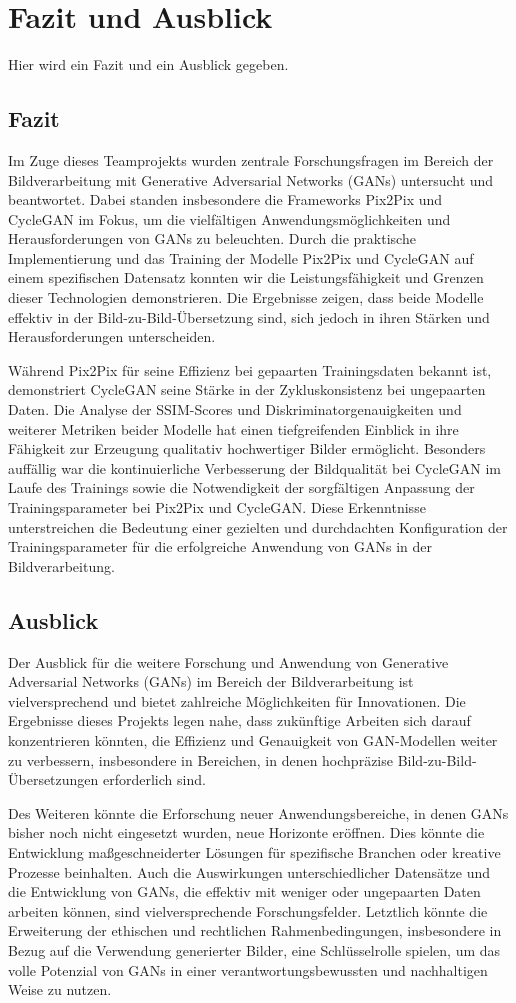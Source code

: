 \chapter{Fazit und Ausblick}
Hier wird ein Fazit und ein Ausblick gegeben.

\section{Fazit}
Im Zuge dieses Teamprojekts wurden zentrale Forschungsfragen im Bereich der Bildverarbeitung mit Generative Adversarial Networks (GANs) untersucht und beantwortet. Dabei standen insbesondere die Frameworks Pix2Pix und CycleGAN im Fokus, um die vielfältigen Anwendungsmöglichkeiten und Herausforderungen von GANs zu beleuchten. Durch die praktische Implementierung und das Training der Modelle Pix2Pix und CycleGAN auf einem spezifischen Datensatz konnten wir die Leistungsfähigkeit und Grenzen dieser Technologien demonstrieren. Die Ergebnisse zeigen, dass beide Modelle effektiv in der Bild-zu-Bild-Übersetzung sind, sich jedoch in ihren Stärken und Herausforderungen unterscheiden.

Während Pix2Pix für seine Effizienz bei gepaarten Trainingsdaten bekannt ist, demonstriert CycleGAN seine Stärke in der Zykluskonsistenz bei ungepaarten Daten. Die Analyse der SSIM-Scores und Diskriminatorgenauigkeiten und weiterer Metriken beider Modelle hat einen tiefgreifenden Einblick in ihre Fähigkeit zur Erzeugung qualitativ hochwertiger Bilder ermöglicht. Besonders auffällig war die kontinuierliche Verbesserung der Bildqualität bei CycleGAN im Laufe des Trainings sowie die Notwendigkeit der sorgfältigen Anpassung der Trainingsparameter bei Pix2Pix und CycleGAN. Diese Erkenntnisse unterstreichen die Bedeutung einer gezielten und durchdachten Konfiguration der Trainingsparameter für die erfolgreiche Anwendung von GANs in der Bildverarbeitung.

\section{Ausblick}
Der Ausblick für die weitere Forschung und Anwendung von Generative Adversarial Networks (GANs) im Bereich der Bildverarbeitung ist vielversprechend und bietet zahlreiche Möglichkeiten für Innovationen. Die Ergebnisse dieses Projekts legen nahe, dass zukünftige Arbeiten sich darauf konzentrieren könnten, die Effizienz und Genauigkeit von GAN-Modellen weiter zu verbessern, insbesondere in Bereichen, in denen hochpräzise Bild-zu-Bild-Übersetzungen erforderlich sind.

Des Weiteren könnte die Erforschung neuer Anwendungsbereiche, in denen GANs bisher noch nicht eingesetzt wurden, neue Horizonte eröffnen. Dies könnte die Entwicklung maßgeschneiderter Lösungen für spezifische Branchen oder kreative Prozesse beinhalten. Auch die Auswirkungen unterschiedlicher Datensätze und die Entwicklung von GANs, die effektiv mit weniger oder ungepaarten Daten arbeiten können, sind vielversprechende Forschungsfelder. Letztlich könnte die Erweiterung der ethischen und rechtlichen Rahmenbedingungen, insbesondere in Bezug auf die Verwendung generierter Bilder, eine Schlüsselrolle spielen, um das volle Potenzial von GANs in einer verantwortungsbewussten und nachhaltigen Weise zu nutzen.
